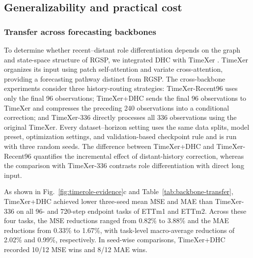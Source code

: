 \subsection{Generalizability and practical cost}

\subsubsection{Transfer across forecasting backbones}

To determine whether recent--distant role differentiation depends on the graph and state-space structure of RGSP, we integrated DHC with TimeXer \citep{Wang2024TimeXer}. TimeXer organizes its input using patch self-attention and variate cross-attention, providing a forecasting pathway distinct from RGSP. The cross-backbone experiments consider three history-routing strategies: TimeXer-Recent96 uses only the final 96 observations; TimeXer+DHC sends the final 96 observations to TimeXer and compresses the preceding 240 observations into a conditional correction; and TimeXer-336 directly processes all 336 observations using the original TimeXer. Every dataset--horizon setting uses the same data splits, model preset, optimization settings, and validation-based checkpoint rule and is run with three random seeds. The difference between TimeXer+DHC and TimeXer-Recent96 quantifies the incremental effect of distant-history correction, whereas the comparison with TimeXer-336 contrasts role differentiation with direct long input.

As shown in Fig.~\ref{fig:timerole-evidence}c and Table~\ref{tab:backbone-transfer}, TimeXer+DHC achieved lower three-seed mean MSE and MAE than TimeXer-336 on all 96- and 720-step endpoint tasks of ETTm1 and ETTm2. Across these four tasks, the MSE reductions ranged from 0.82\% to 3.88\% and the MAE reductions from 0.33\% to 1.67\%, with task-level macro-average reductions of 2.02\% and 0.99\%, respectively. In seed-wise comparisons, TimeXer+DHC recorded 10/12 MSE wins and 8/12 MAE wins.

